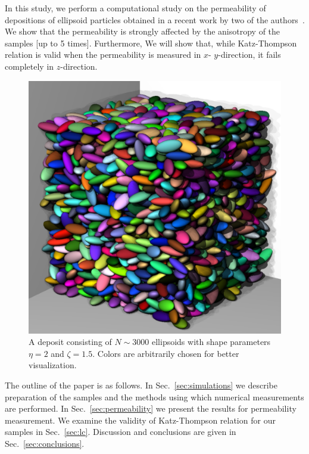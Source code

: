 \documentclass[aps,twocolumn,superscriptaddress,showpacs,showkeys]{revtex4-1}
\begin{document}
In this study, we perform a computational study on the permeability of
depositions of ellipsoid particles obtained in a recent work by two of the
authors~\cite{bib:reza-pedro2011}. We show that the permeability is strongly
affected by the anisotropy of the samples [up to 5 times]. Furthermore, We
will show that, while Katz-Thompson relation is valid when the permeability is
measured in $x$- $y$-direction, it fails completely in $z$-direction.
%
\begin{figure}
\includegraphics*[width=1.0\columnwidth]{fig1}
\caption{
\label{fig:deposit}
A deposit consisting of $N \sim 3000 $ ellipsoids with shape parameters
$\eta=2$ and $\zeta=1.5$.  Colors are arbitrarily chosen for better
visualization.  }
\end{figure}
%
 
The outline of the paper is as follows.  In Sec.~\ref{sec:simulations} we
describe preparation of the samples and the methods using which numerical
measurements are performed.  In Sec.~\ref{sec:permeability} we present the
results for permeability measurement.  We examine the validity of
Katz-Thompson relation for our samples in Sec.~\ref{sec:lc}.  Discussion and
conclusions are given in Sec.~\ref{sec:conclusions}.

\end{document}
